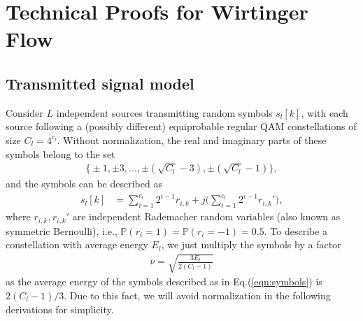 \chapter{Technical Proofs for Wirtinger Flow}
\label{appdx:wf}

\section{Transmitted signal model} \label{appdx:distribution}
Consider $L$ independent sources transmitting random symbols $s_l[k]$, with each source following a (possibly different) equiprobable regular QAM constellations of size $C_l=4^{c_l}$. Without normalization, the real and imaginary parts of these symbols belong to the set
\begin{align}
\big\{\pm 1,\pm 3,\ldots,\pm(\sqrt{C_l}-3),\pm(\sqrt{C_l}-1) \big\},
\end{align}
and the symbols can be described as
\begin{align}
s_l[k]&=\sum_{i=1}^{c_l} 2^{i-1}r_{i,k} +j \Bigg(\sum_{i=1}^{c_l} 2^{i-1}r_{i,k}'\Bigg), \label{eqn:symbols}
\end{align}
where $r_{i,k}, r_{i,k}'$ are independent Rademacher random variables (also known as symmetric Bernoulli), i.e., $\mathbb{P}(r_i=1)= \mathbb{P}(r_i=-1)=0.5$. To describe a constellation with average energy $E_l$, we just multiply the symbols by a factor
\begin{align}
\nu=\sqrt{\frac{3E_l}{2(C_l-1)}}
\end{align}
as the average energy of the symbols described as in Eq.(\ref{eqn:symbols}) is $2(C_l-1)/3$. Due to this fact, we will avoid normalization in the following derivations for simplicity.





